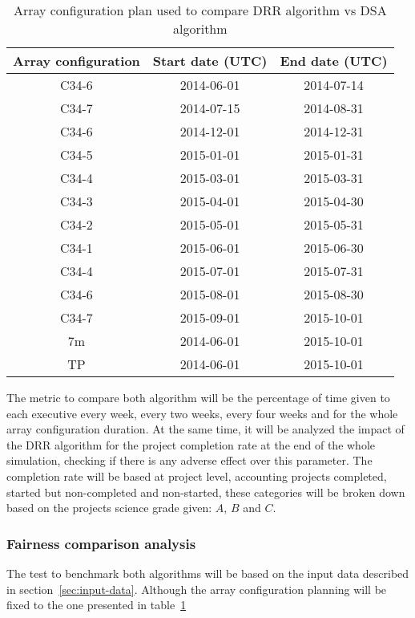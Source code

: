 \begin{table}[b]
\begin{center}
\begin{tabular}{|c|c|c|}
\hline
Array configuration & Start date (UTC) & End date (UTC) \\ \hline
C34-6 & 2014-06-01 & 2014-07-14 \\ \hline
C34-7 & 2014-07-15 & 2014-08-31 \\ \hline
C34-6 & 2014-12-01 & 2014-12-31 \\ \hline
C34-5 & 2015-01-01 & 2015-01-31 \\ \hline
C34-4 & 2015-03-01 & 2015-03-31 \\ \hline
C34-3 & 2015-04-01 & 2015-04-30 \\ \hline
C34-2 & 2015-05-01 & 2015-05-31 \\ \hline
C34-1 & 2015-06-01 & 2015-06-30 \\ \hline
C34-4 & 2015-07-01 & 2015-07-31 \\ \hline
C34-6 & 2015-08-01 & 2015-08-30 \\ \hline
C34-7 & 2015-09-01 & 2015-10-01 \\ \hline
7m & 2014-06-01 & 2015-10-01 \\ \hline
TP & 2014-06-01 & 2015-10-01 \\ \hline
\end{tabular}
\end{center}
\caption{Array configuration plan used to compare DRR algorithm vs DSA algorithm}
\label{table:drr-test-array-config}
\end{table}

The metric to compare both algorithm will be the percentage of time given to each executive every week, every two weeks, every four weeks and for the whole array configuration duration. At the same time, it will be analyzed the impact of the DRR algorithm for the project completion rate at the end of the whole simulation, checking if there is any adverse effect over this parameter. The completion rate will be based at project level, accounting projects completed, started but non-completed and non-started, these categories will be broken down based on the projects science grade given: $A$, $B$ and $C$.

\subsubsection{Fairness comparison analysis}
The test to benchmark both algorithms will be based on the input data described in section~\ref{sec:input-data}. Although the array configuration planning will be fixed to the one presented in table~\ref{table:drr-test-array-config}

